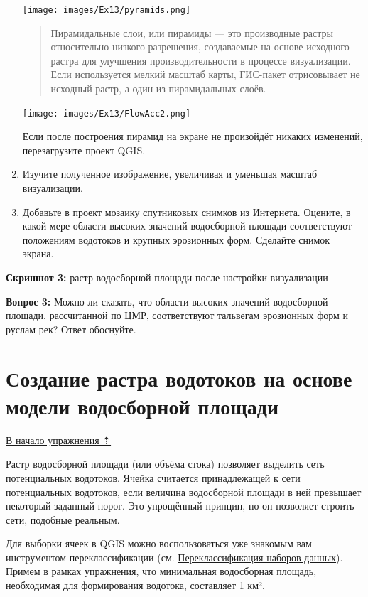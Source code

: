 \documentclass[
  12pt,
]{book}
\begin{document}
\begin{enumerate}
  \texttt{[image: images/Ex13/pyramids.png]}

  \begin{quote}
  Пирамидальные слои, или пирамиды --- это производные растры относительно низкого разрешения, создаваемые на основе исходного растра для улучшения производительности в процессе визуализации. Если используется мелкий масштаб карты, ГИС-пакет отрисовывает не исходный растр, а один из пирамидальных слоёв.
  \end{quote}

  \texttt{[image: images/Ex13/FlowAcc2.png]}

  Если после построения пирамид на экране не произойдёт никаких изменений, перезагрузите проект QGIS.
\item
  Изучите полученное изображение, увеличивая и уменьшая масштаб визуализации.
\item
  Добавьте в проект мозаику спутниковых снимков из Интернета. Оцените, в какой мере области высоких значений водосборной площади соответствуют положениям водотоков и крупных эрозионных форм. Сделайте снимок экрана.
\end{enumerate}

\textbf{Скриншот 3:} растр водосборной площади после настройки визуализации

\textbf{Вопрос 3:} Можно ли сказать, что области высоких значений водосборной площади, рассчитанной по ЦМР, соответствуют тальвегам эрозионных форм и руслам рек? Ответ обоснуйте.

\hypertarget{hydrodem-network}{%
\section{Создание растра водотоков на основе модели водосборной площади}\label{hydrodem-network}}

\protect\hyperlink{hydrodem}{В начало упражнения ⇡}

Растр водосборной площади (или объёма стока) позволяет выделить сеть потенциальных водотоков. Ячейка считается принадлежащей к сети потенциальных водотоков, если величина водосборной площади в ней превышает некоторый заданный порог. Это упрощённый принцип, но он позволяет строить сети, подобные реальным.

Для выборки ячеек в QGIS можно воспользоваться уже знакомым вам инструментом переклассификации (см. \protect\hyperlink{weighted-overlay-reclass}{Переклассификация наборов данных}). Примем в рамках упражнения, что минимальная водосборная площадь, необходимая для формирования водотока, составляет 1 км².
\end{document}
